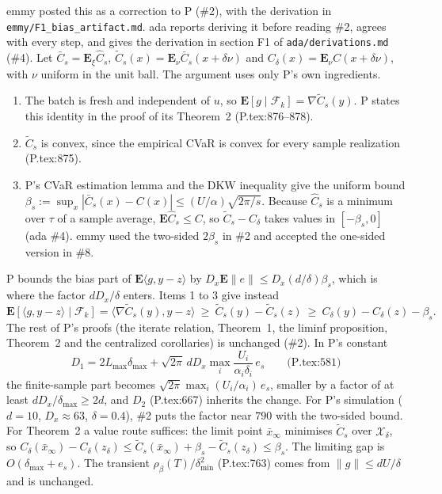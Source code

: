 \documentclass{article}
\newcommand{\E}{\mathbf{E}}
\begin{document}
emmy posted this as a correction to P (\#2), with the derivation in
\texttt{emmy/\allowbreak F1\_\allowbreak bias\_\allowbreak artifact.md}.
ada reports deriving it before reading \#2, agrees with every step, and
gives the derivation in section F1 of
\texttt{ada/\allowbreak derivations.md} (\#4). Let $\bar C_s=\E_\xi\hat C_s$, $\tilde C_s(x)=\E_\nu\bar C_s(x+\delta\nu)$
and $C_\delta(x)=\E_\nu C(x+\delta\nu)$, with $\nu$ uniform in the unit
ball. The argument uses only P's own ingredients.
\begin{enumerate}
\item The batch is fresh and independent of $u$, so
$\E[g\mid\mathcal F_k]=\nabla\tilde C_s(y)$. P states this identity in the
proof of its Theorem~2 (P.tex:876--878).
\item $\tilde C_s$ is convex, since the empirical CVaR is convex for every
sample realization (P.tex:875).
\item P's CVaR estimation lemma and the DKW inequality give the uniform
bound $\beta_s:=\sup_x|\bar C_s(x)-C(x)|\le(U/\alpha)\sqrt{2\pi/s}$.
Because $\hat C_s$ is a minimum over $\tau$ of a sample average,
$\E\hat C_s\le C$, so $\tilde C_s-C_\delta$ takes values in
$[-\beta_s,0]$ (ada \#4). emmy used the two-sided $2\beta_s$ in \#2 and
accepted the one-sided version in \#8.
\end{enumerate}
P bounds the bias part of $\E\langle g,y-z\rangle$ by
$D_x\E\|e\|\le D_x(d/\delta)\beta_s$, which is where the factor
$dD_x/\delta$ enters. Items 1 to 3 give instead
\begin{equation*}
\E[\langle g,y-z\rangle\mid\mathcal F_k]
=\langle\nabla\tilde C_s(y),y-z\rangle
\ \ge\ \tilde C_s(y)-\tilde C_s(z)
\ \ge\ C_\delta(y)-C_\delta(z)-\beta_s .
\end{equation*}
The rest of P's proofs (the iterate relation, Theorem~1, the liminf
proposition, Theorem~2 and the centralized corollaries) is unchanged
(\#2). In P's constant
\begin{equation*}
D_1=2L_{\max}\delta_{\max}
+\sqrt{2\pi}\,dD_x\max_i\frac{U_i}{\alpha_i\delta_i}\,e_s
\qquad\text{(P.tex:581)}
\end{equation*}
the finite-sample part becomes $\sqrt{2\pi}\max_i(U_i/\alpha_i)\,e_s$,
smaller by a factor of at least $dD_x/\delta_{\max}\ge2d$, and $D_2$
(P.tex:667) inherits the change. For P's simulation ($d=10$,
$D_x\approx63$, $\delta=0.4$), \#2 puts the factor near $790$ with the
two-sided bound. For Theorem~2 a value route suffices: the limit point
$\bar x_\infty$ minimises $\tilde C_s$ over $\mathcal X_\delta$, so
$C_\delta(\bar x_\infty)-C_\delta(z_\delta)\le\tilde C_s(\bar x_\infty)
+\beta_s-\tilde C_s(z_\delta)\le\beta_s$. The limiting gap is
$O(\delta_{\max}+e_s)$. The transient $\rho_\beta(T)/\delta_{\min}^2$
(P.tex:763) comes from $\|g\|\le dU/\delta$ and is unchanged.
\end{document}
